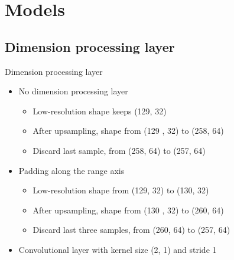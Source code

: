 \documentclass{beamer}
\newcounter{section}
\begin{document}
\section{Models}
\subsection{Dimension processing layer}
\setcounter{section}{2}
\setcounter{figure}{0}

\begin{frame}[t]{Dimension processing layer}
    \begin{itemize}
    	\item No dimension processing layer
            \begin{itemize}
                \vspace{0.2\baselineskip}
                \item Low-resolution shape keeps (129, 32)
                \vspace{0.2\baselineskip}
                \item After upsampling, shape from (129 , 32) to (258, 64)
                \vspace{0.2\baselineskip}
                \item Discard last sample, from (258, 64) to (257, 64)
            \end{itemize}
        \vspace{0.5\baselineskip}
        \item Padding along the range axis
            \begin{itemize}
                \vspace{0.2\baselineskip}
                \item Low-resolution shape from (129, 32) to (130, 32)
                \vspace{0.2\baselineskip}
                \item After upsampling, shape from (130 , 32) to (260, 64)
                \vspace{0.2\baselineskip}
                \item Discard last three samples, from (260, 64) to (257, 64)
            \end{itemize}
        \vspace{0.5\baselineskip}
        \item Convolutional layer with kernel size (2, 1) and stride 1

\end{itemize}
\end{frame}
\end{document}
